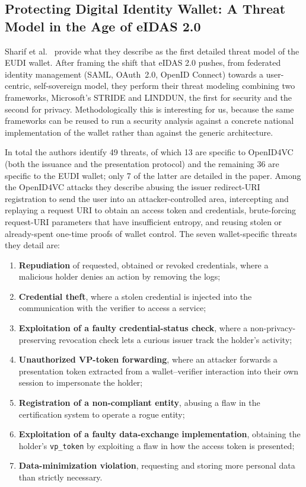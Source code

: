 \documentclass{article}
\begin{document}
\subsection{Protecting Digital Identity Wallet: A Threat Model in the Age of eIDAS 2.0}
\label{protectingeudi}
Sharif et al.~\cite{Sharif2024Protecting} provide what they describe as the first detailed threat model of the EUDI
wallet. After framing the shift that eIDAS 2.0 pushes, from federated identity management (SAML, OAuth~2.0, OpenID
Connect) towards a user-centric, self-sovereign model, they perform their threat modeling combining two frameworks,
Microsoft's STRIDE and LINDDUN, the first for security and the second for privacy. Methodologically this is interesting
for us, because the same frameworks can be reused to run a security analysis against a concrete national implementation
of the wallet rather than against the generic architecture.

In total the authors identify 49 threats, of which 13 are specific to OpenID4VC (both the issuance and the presentation
protocol) and the remaining 36 are specific to the EUDI wallet; only 7 of the latter are detailed in the paper. Among
the OpenID4VC attacks they describe abusing the issuer redirect-URI registration to send the user into an
attacker-controlled area, intercepting and replaying a request URI to obtain an access token and credentials,
brute-forcing request-URI parameters that have insufficient entropy, and reusing stolen or already-spent one-time
proofs of wallet control. The seven wallet-specific threats they detail are:
\begin{enumerate}[noitemsep]
  \item \textbf{Repudiation} of requested, obtained or revoked credentials, where a malicious holder denies an action by removing the logs;
  \item \textbf{Credential theft}, where a stolen credential is injected into the communication with the verifier to access a service;
  \item \textbf{Exploitation of a faulty credential-status check}, where a non-privacy-preserving revocation check lets a curious issuer track the holder's activity;
  \item \textbf{Unauthorized VP-token forwarding}, where an attacker forwards a presentation token extracted from a wallet--verifier interaction into their own session to impersonate the holder;
  \item \textbf{Registration of a non-compliant entity}, abusing a flaw in the certification system to operate a rogue entity;
  \item \textbf{Exploitation of a faulty data-exchange implementation}, obtaining the holder's \texttt{vp\_token} by exploiting a flaw in how the access token is presented;
  \item \textbf{Data-minimization violation}, requesting and storing more personal data than strictly necessary.
\end{enumerate}
\end{document}
